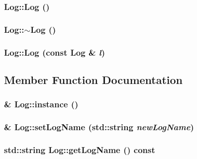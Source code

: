 \subsubsection{\setlength{\rightskip}{0pt plus 5cm}Log::Log ()\hspace{0.3cm}{\tt  [private]}}\label{classLog_f6071a60aa52b6c1b511f99b4bc1b8fe}


\subsubsection{\setlength{\rightskip}{0pt plus 5cm}Log::$\sim$Log ()\hspace{0.3cm}{\tt  [private]}}\label{classLog_0fbfda88fbee5027c89f6eb121059360}


\subsubsection{\setlength{\rightskip}{0pt plus 5cm}Log::Log (const {\bf Log} \& {\em l})\hspace{0.3cm}{\tt  [private]}}\label{classLog_756aec21ec377fbc703f787e7f5fb832}




\subsection{Member Function Documentation}
\subsubsection{ \& Log::instance ()\hspace{0.3cm}{\tt  [static]}}\label{classLog_aa59866ce9e78db15ce7aaeb00fc1063}


\subsubsection{ \& Log::set\-Log\-Name (std::string {\em new\-Log\-Name})}\label{classLog_f8cf0541a8284aabd5fe924a9cd2eab8}


\subsubsection{\setlength{\rightskip}{0pt plus 5cm}std::string Log::get\-Log\-Name () const\hspace{0.3cm}{\tt  [inline]}}\label{classLog_9090c0fbbc5a3223dbd361a827788c17}


